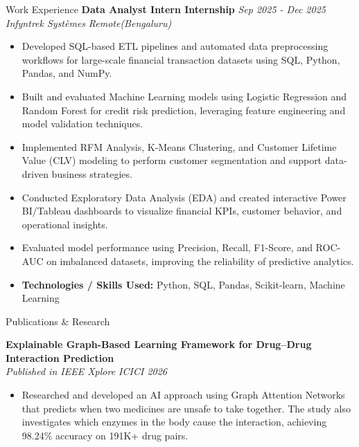 \documentclass{resume}
\begin{document}
\begin{rSection}{Work Experience}
\vspace{0.15cm}
{\bf Data Analyst Intern \textbar{} Internship} \hfill {\em Sep 2025 - Dec 2025} \\
{\em Infyntrek Syst\`emes} \hfill {\em Remote(Bengaluru)}
\begin{itemize}
    \vspace{-0.2cm}\item Developed SQL-based ETL pipelines and automated data preprocessing workflows for large-scale financial transaction datasets using SQL, Python, Pandas, and NumPy.
    \vspace{-0.25cm}\item Built and evaluated Machine Learning models using Logistic Regression and Random Forest for credit risk prediction, leveraging feature engineering and model validation techniques.
    \vspace{-0.25cm}\item Implemented RFM Analysis, K-Means Clustering, and Customer Lifetime Value (CLV) modeling to perform customer segmentation and support data-driven business strategies.
    \vspace{-0.25cm}\item Conducted Exploratory Data Analysis (EDA) and created interactive Power BI/Tableau dashboards to visualize financial KPIs, customer behavior, and operational insights.
    \vspace{-0.25cm}\item Evaluated model performance using Precision, Recall, F1-Score, and ROC-AUC on imbalanced datasets, improving the reliability of predictive analytics.
    \vspace{-0.25cm}\item {\bf Technologies / Skills Used:} Python, SQL, Pandas, Scikit-learn, Machine Learning
\end{itemize}

\end{rSection}

\begin{rSection}{Publications \& Research}

{\bf Explainable Graph-Based Learning Framework for Drug--Drug Interaction Prediction} \\
{\em Published in IEEE Xplore \textbar{} ICICI 2026}
\begin{itemize}
    \vspace{-0.2cm}\item Researched and developed an AI approach using Graph Attention Networks that predicts when two medicines are unsafe to take together. The study also investigates which enzymes in the body cause the interaction, achieving 98.24\% accuracy on 191K+ drug pairs.
\end{itemize}

\end{rSection}
\end{document}
